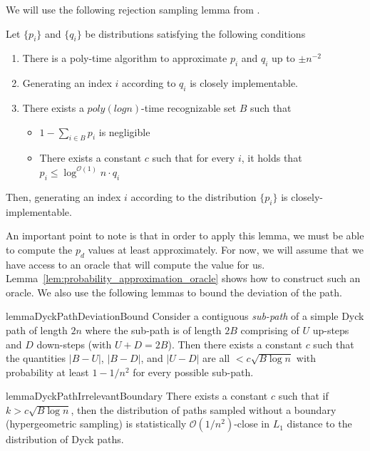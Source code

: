 We will use the following rejection sampling lemma from \cite{huge}.
\begin{lemma}
\label{lem:huge}
Let $\{p_i\}$ and $\{q_i\}$ be distributions satisfying the following conditions
\begin{enumerate}
    \item There is a poly-time algorithm to approximate $p_i$ and $q_i$ up to $\pm n^{-2}$
    \item Generating an index $i$ according to $q_i$ is closely implementable.
    \item There exists a $poly(log n)$-time recognizable set $B$ such that
    \begin{itemize}
        \item $1-\sum\limits_{i\in B} p_i$ is negligible
        \item There exists a constant $c$ such that for every $i$, it holds that $p_i\le \log^{\mathcal{O}(1)} n\cdot q_i$
    \end{itemize}
\end{enumerate}
Then, generating an index $i$ according to the distribution $\{p_i\}$ is closely-implementable.
\end{lemma}
An important point to note is that in order to apply this lemma, we must be able to compute the $p_d$ values at least approximately.
For now, we will assume that we have access to an oracle that will compute the value for us.
Lemma~\ref{lem:probability_approximation_oracle} shows how to construct such an oracle.
We also use the following lemmas to bound the deviation of the path.
\begin{restatable}{lemma}{DyckPathDeviationBound}
\label{lem:dyck_path_deviation_bound}
Consider a contiguous \emph{sub-path} of a simple Dyck path of length $2n$
where the sub-path is of length $2B$ comprising of $U$ up-steps and $D$ down-steps (with $U + D = 2B$).
Then there exists a constant $c$ such that the quantities $|B-U|$, $|B-D|$, and $|U-D|$
are all $<c\sqrt{B\log n}$ with probability at least $1-1/n^2$ for every possible sub-path.
\end{restatable}
\begin{restatable}{lemma}{DyckPathIrrelevantBoundary}
\label{lem:dyck_path_irrelevant_boundary}
There exists a constant $c$ such that if $k > c \sqrt{B\log n}$, then the distribution of paths sampled without a boundary
(hypergeometric sampling) is statistically $\mathcal O(1/n^2)$-close in $L_1$ distance to the distribution of Dyck paths.
\end{restatable}


